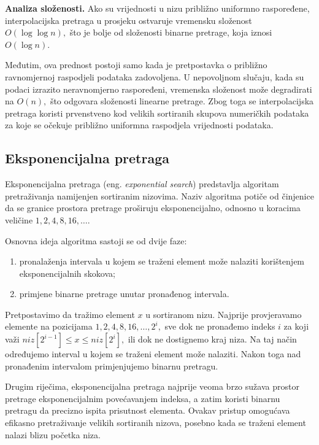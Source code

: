 \textbf{Analiza složenosti.} Ako su vrijednosti u nizu približno uniformno raspoređene, interpolacijska pretraga u prosjeku ostvaruje vremensku slože\-nost $O(\log\log n),$ što je bolje od složenosti binarne pretrage, koja iznosi $O(\log n)$.

Međutim, ova prednost postoji samo kada je pretpostavka o približno ravnomjernoj raspodjeli podataka zadovoljena. U nepovoljnom slučaju, kada su podaci izrazito neravnomjerno raspoređeni, vremenska složenost može degradirati na $O(n),$ što odgovara složenosti linearne pretrage. Zbog toga se interpolacijska pretraga koristi prvenstveno kod velikih sortiranih skupova numeričkih podataka za koje se očekuje približno uniformna raspodjela vrijednosti podataka.


\subsection{Eksponencijalna pretraga}

Eksponencijalna pretraga (eng. \emph{exponential search}) predstavlja algoritam pretraživanja namijenjen sortiranim nizovima. Naziv algoritma potiče od činjenice da se granice prostora pretrage proširuju eksponencijalno, odnosno u koracima veličine $1, 2, 4, 8, 16, \ldots$.

Osnovna ideja algoritma sastoji se od dvije faze:

\begin{enumerate}
	\item pronalaženja intervala u kojem se traženi element može nalaziti korištenjem eksponencijalnih skokova;
	\item primjene binarne pretrage unutar pronađenog intervala.
\end{enumerate}

Pretpostavimo da tražimo element $x$ u sortiranom nizu. Najprije provjeravamo elemente na pozicijama $1, 2, 4, 8, 16, \ldots, 2^i,$ sve dok ne pronađemo indeks $i$ za koji važi $niz[2^{i-1}] \leq x \leq niz[2^i],$  ili dok ne dostignemo kraj niza. Na taj način određujemo interval u kojem se traženi element može nalaziti. Nakon toga nad pronađenim intervalom primjenjujemo binarnu pretragu.

Drugim riječima, eksponencijalna pretraga najprije veoma brzo sužava prostor pretrage eksponencijalnim povećavanjem indeksa, a zatim koristi binarnu pretragu da precizno ispita prisutnost elementa. Ovakav pristup omogućava efikasno pretraživanje velikih sortiranih nizova, posebno kada se traženi element nalazi blizu početka niza.

